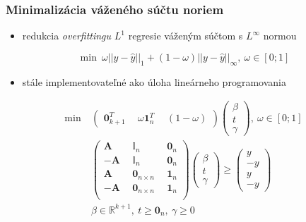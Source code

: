 \documentclass[presentation.tex]{subfiles}
\begin{document}
\begin{frame}
	\frametitle{Minimalizácia váženého súčtu noriem}
	
	\begin{itemize}
		\item redukcia \textit{overfittingu} $L^1$ regresie váženým súčtom s $L^{\infty}$ normou
	\end{itemize}
	\begin{equation*}
		\min ~ \omega||y - \hat{y}||_1 + (1-\omega)||y - \hat{y}||_{\infty},~\omega \in [0;1]
	\end{equation*}
	\vspace{-0.8cm}
	\begin{itemize}
		\item stále implementovateľné ako úloha lineárneho programovania
	\end{itemize}
{\scriptsize
	\setlength{\abovedisplayskip}{6pt}
	\setlength{\belowdisplayskip}{\abovedisplayskip}
	\setlength{\abovedisplayshortskip}{0pt}
	\setlength{\belowdisplayshortskip}{3pt}
\begin{align*}
	\text{min}~ &
	\left(
	\begin{array}{c|c|c}
		\mathbf{0}_{k+1}^T ~ & ~\omega\mathbf{1}_n^T ~& ~(1 - \omega)
	\end{array}
	\right)
	\left(
	\begin{array}{c}
		\beta \\
		\hline
		t \\
		\hline
		\gamma
	\end{array}
	\right), ~ \omega \in [0; 1]\\
	&\left(
	\begin{array}{c|c|c}
		\mathbf{A} ~&~ \mathbb{I}_n ~&~ \mathbf{0}_n \\
		\hline
		-\mathbf{A} ~&~ \mathbb{I}_n ~&~ \mathbf{0}_n \\
		\hline
		\mathbf{A} ~&~ \mathbf{0}_{n \times n} ~&~ \mathbf{1}_n \\
		\hline
		-\mathbf{A} ~&~ \mathbf{0}_{n \times n} ~&~ \mathbf{1}_n \\
	\end{array}
	\right)
	\left(
	\begin{array}{c}
		\beta \\
		\hline
		t \\
		\hline
		\gamma
	\end{array}
	\right)
	\geq
	\left(
	\begin{array}{c}
		y \\
		\hline
		-y \\
		\hline
		y \\
		\hline
		-y
	\end{array}
	\right) \\
	&\beta \in \mathbb{R}^{k+1},~t \geq \mathbf{0}_{n},~\gamma \geq 0
\end{align*}
}%
\end{frame}
\end{document}
